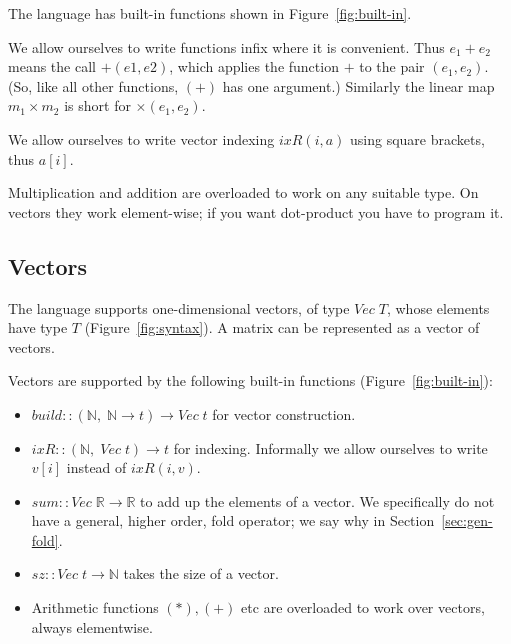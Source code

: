 \documentclass[sigplan,review]{acmart}
\renewcommand{\to}{\rightarrow}    %
\newcommand{\buildfun}{\mathit{build}}
\newcommand{\sumfunname}{\mathit{sum}}   %
\newcommand{\sizefun}{sz}
\newcommand{\deltafun}[2]{\delta(#1,#2)}
\newcommand{\indexfunname}{\mathit{ixR}} %
\newcommand{\indexfun}[2]{\indexfunname(#2,#1)} %
\renewcommand{\vector}[1]{\mathit{Vec}\;#1}   %
\newcommand{\real}{\mathbb{R}}       %
\newcommand{\nat}{\mathbb{N}}        %
\newcommand{\lmvcat}{\times}         %
\newcommand{\simon}[1]{}
\begin{document}
The language has built-in functions shown in Figure~\ref{fig:built-in}.

We allow ourselves to write functions infix where it is convenient.
Thus $e_1 + e_2$ means the call $+(e1,e2)$, which applies the function $+$ to
the pair $(e_1,e_2)$.  (So, like all other functions, $(+)$ has one argument.)
Similarly the linear map $m_1 \lmvcat m_2$ is short for $\lmvcat(e_1,e_2)$.

We allow ourselves to write vector indexing $\indexfun{a}{i}$ using square brackets, thus $a[i]$.

Multiplication and addition are overloaded to work on any suitable type.
On vectors they work element-wise; if you want dot-product you have to program it.



\subsection{Vectors}

The language supports one-dimensional vectors, of type $\vector{T}$,
whose elements have type $T$ (Figure~\ref{fig:syntax}).
A matrix can be represented as a vector of vectors.

Vectors are supported by the following built-in functions (Figure~\ref{fig:built-in}):
\begin{itemize}
\item $\buildfun :: (\nat,\; \nat \to t) \to \vector{t}$ for vector construction.
\item $\indexfunname :: (\nat,\; \vector{t}) \to t$ for indexing.  Informally we allow ourselves to write
  $v[i]$ instead of $\indexfun{v}{i}$.
\item $\sumfunname :: \vector{\real} \to \real$ to add up the elements of a vector.
We specifically do not have a general, higher order, fold operator;
we say why in Section~\ref{sec:gen-fold}.
\item $\sizefun :: \vector{t} \to \nat$ takes the size of a vector.
\item Arithmetic functions $(*), (+)$ etc are overloaded to work over vectors, always elementwise.
\end{itemize}


\simon{Do we need scan?  Or (specialising to $(+)$) cumulative sum?}
\end{document}
